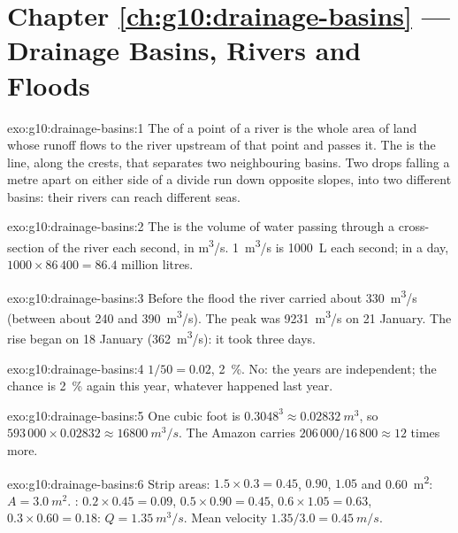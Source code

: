 \section*{Chapter \ref{ch:g10:drainage-basins} --- Drainage Basins, Rivers and Floods}

\begin{solution}{exo:g10:drainage-basins:1}
The  of a point of a river is the whole area of land whose
runoff flows to the river upstream of that point and passes it. The  is the line, along the crests, that separates two neighbouring basins.
Two drops falling a metre apart on either side of a divide run down opposite
slopes, into two different basins: their rivers can reach different seas.
\end{solution}

\begin{solution}{exo:g10:drainage-basins:2}
The  is the volume of water passing through a cross-section of the
river each second, in \unit{m^3/s}. \qty{1}{m^3/s} is \qty{1000}{L} each
second; in a day, $1000 \times 86\,400 = 86.4$ million litres.
\end{solution}

\begin{solution}{exo:g10:drainage-basins:3}
Before the flood the river carried about \qty{330}{m^3/s} (between about
\num{240} and \qty{390}{m^3/s}). The peak was \qty{9231}{m^3/s} on
21 January. The rise began on 18 January (\qty{362}{m^3/s}): it took three
days.
\end{solution}

\begin{solution}{exo:g10:drainage-basins:4}
$1/50 = 0.02$, \qty{2}{\percent}. No: the years are independent; the chance
is \qty{2}{\percent} again this year, whatever happened last year.
\end{solution}

\begin{solution}{exo:g10:drainage-basins:5}
One cubic foot is $0.3048^3 \approx \qty{0.02832}{m^3}$, so
$593\,000 \times 0.02832 \approx \qty{16800}{m^3/s}$. The Amazon carries
$206\,000/16\,800 \approx 12$ times more.
\end{solution}

\begin{solution}{exo:g10:drainage-basins:6}
Strip areas: $1.5 \times 0.3 = 0.45$, $0.90$, $1.05$ and \qty{0.60}{m^2}:
$A = \qty{3.0}{m^2}$. : $0.2 \times 0.45 = 0.09$, $0.5 \times 0.90
= 0.45$, $0.6 \times 1.05 = 0.63$, $0.3 \times 0.60 = 0.18$: $Q =
\qty{1.35}{m^3/s}$. Mean velocity $1.35/3.0 = \qty{0.45}{m/s}$.
\end{solution}

